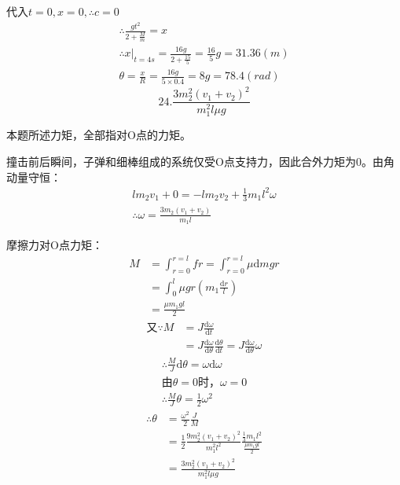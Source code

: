 \documentclass[blue, pad]{./templete/qyxfnote}
\newcommand{\di}[1]{\mathrm{d}#1}
\newcommand{\dy}[2]{\frac{\di{#1}}{\di{#2}}}
\begin{document}
			代入$ t=0,x=0,\therefore c=0 $
			\begin{gather*}
			\therefore \frac{gt^2}{2+\frac{M}{m}}=x\\
			\therefore x\left.\right|_{t=4s}=\frac{16g}{2+\frac{15}{5}}=\frac{16}{5}g=31.36(m)\\
			\theta=\frac{x}{R}=\frac{16g}{5\times 0.4}=8g=78.4(rad)
			\end{gather*}
			\[24.\frac{3m_2^2(v_1+v_2)^2}{m_1^2l\mu g}\]\par
			本题所述力矩，全部指对O点的力矩。\par
			撞击前后瞬间，子弹和细棒组成的系统仅受O点支持力，因此合外力矩为0。由角动量守恒：
			\begin{gather*}
			lm_2v_1+0=-lm_2v_2+\frac{1}{3}m_1l^2\omega\\
			\therefore \omega=\frac{3m_2(v_1+v_2)}{m_1l}
			\end{gather*}\par
			摩擦力对O点力矩：
			\begin{align*}
			M	&=\int_{r=0}^{r=l}fr=\int_{r=0}^{r=l}\mu \di{m}gr\\
			&=\int_0^l\mu gr\left(m_1\frac{\di{r}}{l}\right)\\
			&=\frac{\mu m_1gl}{2}
			\end{align*}
			\begin{align*}
			\text{又}\because M&=J\dy{\omega}{t}\\
			&=J\dy{\omega}{\theta}\dy{\theta}{t}=J\dy{\omega}{\theta}\omega
			\end{align*}
			\begin{gather*}
			\therefore \frac{M}{J}\di{\theta}=\omega\di{\omega}\\
			\text{由}\theta=0\text{时}，\omega=0\\
			\therefore \frac{M}{J}\theta=\frac{1}{2}\omega^2
			\end{gather*}
			\begin{align*}
			\therefore \theta&=\frac{\omega^2}{2}\frac{J}{M}\\
			&=\frac{1}{2}\frac{9m_2^2(v_1+v_2)^2}{m_1^2l^2}\frac{\frac{1}{3}m_1l^2}{\frac{\mu m_1gl}{2}}\\
			&=\frac{3m_2^2(v_1+v_2)^2}{m_1^2l\mu g}
			\end{align*}

	
	
\end{document}
